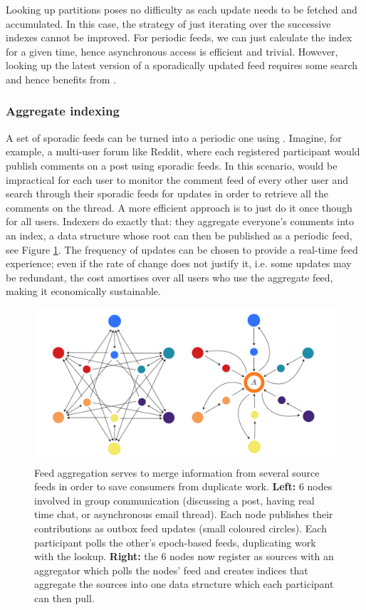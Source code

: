 Looking up partitions poses no difficulty as each update needs to be fetched and accumulated. In this case, the strategy of just iterating over the successive indexes cannot be improved.
For periodic feeds, we can just calculate the index for a given time, hence asynchronous access is efficient and trivial. 
However, looking up the latest version of a sporadically updated feed requires some search and hence benefits from .



\subsubsection{Aggregate indexing}

A set of sporadic feeds can be turned into a periodic one using . Imagine, for example, a multi-user forum like Reddit, where each registered participant would publish comments on a post using sporadic feeds. In this scenario, would be impractical for each user to monitor the comment feed of every other user and search through their sporadic feeds for updates in order to retrieve all the comments on the thread. A more efficient approach is to just do it once though for all users. Indexers do exactly that: they aggregate everyone's comments into an index, a data structure whose root can then be published as a periodic feed, see Figure \ref{fig:feed-aggregation}. The frequency of updates can be chosen to provide a real-time feed experience; even if the rate of change does not justify it, i.e. some updates may be redundant, the cost amortises over all users who use the aggregate feed, making it economically sustainable. 

\begin{figure}[htbp]
\centering
\includegraphics[width=\textwidth]{fig/feed-aggregation-2.pdf}
\caption[Feed aggregation \statusyellow]{Feed aggregation serves to merge information from several source feeds in order to save consumers from duplicate work. \textbf{Left:} 6 nodes involved in group communication (discussing a post, having real time chat, or asynchronous email thread). Each node publishes their contributions as outbox feed updates (small coloured circles). Each participant polls the other's epoch-based feeds, duplicating work with the lookup. \textbf{Right:} the 6 nodes now register  as sources  with an aggregator which polls the nodes' feed and creates indices that aggregate the sources into one data structure which each participant can then pull.}
\label{fig:feed-aggregation}
\end{figure}


